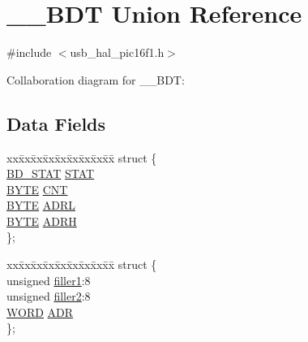 \hypertarget{union_____b_d_t}{}\section{\+\_\+\+\_\+\+B\+D\+T Union Reference}
\label{union_____b_d_t}


{\ttfamily \#include $<$usb\+\_\+hal\+\_\+pic16f1.\+h$>$}



Collaboration diagram for \+\_\+\+\_\+\+B\+D\+T\+:
\subsection*{Data Fields}
\begin{DoxyCompactItemize}
\item 
\begin{tabbing}
xx\=xx\=xx\=xx\=xx\=xx\=xx\=xx\=xx\=\kill
struct \{\\
\>\hyperlink{usb__hal__pic16f1_8h_a669828f95c5a1f57f02f0a5481368db6}{BD\_STAT} \hyperlink{union_____b_d_t_ac3cab1502caf8390e8ec18cba01f2f09}{STAT}\\
\>\hyperlink{_generic_type_defs_8h_a4ae1dab0fb4b072a66584546209e7d58}{BYTE} \hyperlink{union_____b_d_t_aa47496fdbb315cdb40ee4b6a18fe21c4}{CNT}\\
\>\hyperlink{_generic_type_defs_8h_a4ae1dab0fb4b072a66584546209e7d58}{BYTE} \hyperlink{union_____b_d_t_aed7cec86ac74d18c84b2a992136bd01d}{ADRL}\\
\>\hyperlink{_generic_type_defs_8h_a4ae1dab0fb4b072a66584546209e7d58}{BYTE} \hyperlink{union_____b_d_t_a6a7af362f9570b9847cb9df593fe49d3}{ADRH}\\
\}; \\

\end{tabbing}\item 
\begin{tabbing}
xx\=xx\=xx\=xx\=xx\=xx\=xx\=xx\=xx\=\kill
struct \{\\
\>unsigned \hyperlink{union_____b_d_t_a41e639a5571e0a5239545b363f0284a0}{filler1}:8\\
\>unsigned \hyperlink{union_____b_d_t_af0da7963e5d18db6d00c9605bdd265c9}{filler2}:8\\
\>\hyperlink{_generic_type_defs_8h_a2b0e863dadf920709ec53d9088ee7c91}{WORD} \hyperlink{union_____b_d_t_a9ff8e0fbc95a686640894b480a1ce71f}{ADR}\\
\}; \\


\end{tabbing}
\end{DoxyCompactItemize}
